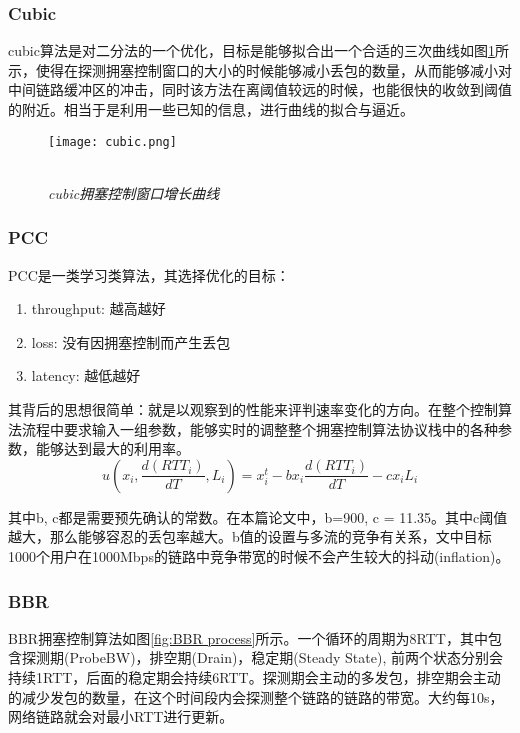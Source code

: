 \documentclass[a4paper, 12pt, UTF8]{ctexart}
\begin{document}
\subsubsection{Cubic}
\par cubic算法\cite{10.1145/1400097.1400105}是对二分法的一个优化，目标是能够拟合出一个合适的三次曲线如图\ref{fig:cubics algorithm}所示，使得在探测拥塞控制窗口的大小的时候能够减小丢包的数量，从而能够减小对中间链路缓冲区的冲击，同时该方法在离阈值较远的时候，也能很快的收敛到阈值的附近。相当于是利用一些已知的信息，进行曲线的拟合与逼近。

\begin{figure}[H]
	\centering \texttt{[image: cubic.png]}
	\\ \hspace*{\fill} \\
	\caption{\em cubic拥塞控制窗口增长曲线}
	\label{fig:cubics algorithm}
\end{figure}

\subsubsection{PCC}
\par PCC\cite{DongMZAGGS18}是一类学习类算法，其选择优化的目标：
\begin{enumerate}
	\item throughput: 越高越好
	\item loss: 没有因拥塞控制而产生丢包
	\item latency: 越低越好
\end{enumerate}
\par 其背后的思想很简单：就是以观察到的性能来评判速率变化的方向。在整个控制算法流程中要求输入一组参数，能够实时的调整整个拥塞控制算法协议栈中的各种参数，能够达到最大的利用率。
$$
u(x_i, \frac{d(RTT_i)}{dT}, L_i) = x_i^t-bx_i\frac{d(RTT_i)}{dT}-cx_iL_i
$$
\par 其中b, c都是需要预先确认的常数。在本篇论文中，b=900, c = 11.35。其中c阈值越大，那么能够容忍的丢包率越大。b值的设置与多流的竞争有关系，文中目标1000个用户在1000Mbps的链路中竞争带宽的时候不会产生较大的抖动(inflation)。

\subsubsection{BBR}
\par BBR\cite{DBLP:journals/queue/CardwellCGYJ16}拥塞控制算法如图\ref{fig:BBR process}所示。一个循环的周期为8RTT，其中包含探测期(ProbeBW)，排空期(Drain)，稳定期(Steady State), 前两个状态分别会持续1RTT，后面的稳定期会持续6RTT。探测期会主动的多发包，排空期会主动的减少发包的数量，在这个时间段内会探测整个链路的链路的带宽。大约每10s，网络链路就会对最小RTT进行更新。
\end{document}
